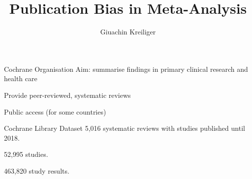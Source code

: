 \documentclass[english]{beamer}\usepackage[]{graphicx}\usepackage[]{color}
\title{Publication Bias in Meta-Analysis}%
\author{Giuachin Kreiliger}
\begin{document}
\maketitle

% 
% 

\begin{frame}{Cochrane Organisation}
Aim: summarise findings in primary clinical research and health care

Provide peer-reviewed, systematic reviews

Public access (for some countries)
\end{frame}


\begin{frame}{Cochrane Library Dataset}
5,016 systematic reviews with studies published until 2018.

52,995 studies.

463,820 study results.
\end{frame}
\end{document}
